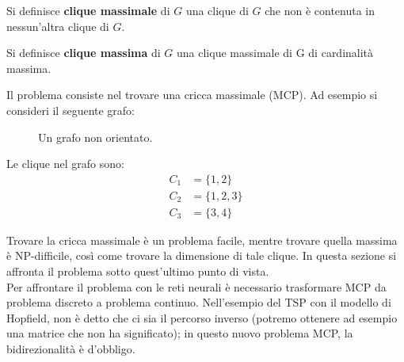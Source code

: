 \begin{mydef}
Si definisce \textbf{clique massimale} di $G$ una clique di $G$ che non è contenuta in nessun'altra clique di $G$.    
\end{mydef}

\begin{mydef}
    Si definisce \textbf{clique massima} di $G$ una clique massimale di G di cardinalità massima.
\end{mydef}
Il problema consiste nel trovare una cricca massimale (MCP). Ad esempio si consideri il seguente grafo:

\begin{figure}[h!]
    \centering
    \caption{Un grafo non orientato.}\label{fig:graph1}
\end{figure}
Le clique nel grafo sono:
\begin{align*}
    C_1 &= \{1,2\} \tag{$C_1$ non è massimale perché $C_1 \subseteq C_2$}\\
    C_2 &= \{1,2,3\} \tag{Massimale e massima}\\
    C_3 &= \{3,4\} \tag{Massimale}
\end{align*}

\newpage

Trovare la cricca massimale è un problema facile, mentre trovare quella massima è NP-difficile, così come trovare la dimensione di tale clique. In questa sezione si affronta il problema sotto quest'ultimo punto di vista.\\

Per affrontare il problema con le reti neurali è necessario trasformare MCP da problema discreto a problema continuo. Nell'esempio del TSP con il modello di Hopfield, non è detto che ci sia il percorso inverso (potremo ottenere ad esempio una matrice che non ha significato); in questo nuovo problema MCP, la bidirezionalità è d'obbligo.\\

